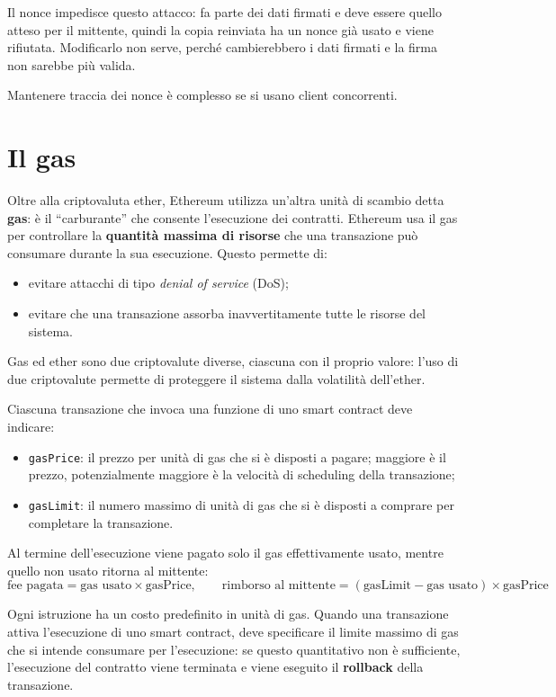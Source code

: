 \documentclass[a4paper, 11pt, oneside]{book}
\newcommand{\cod}[1]{\texttt{#1}} %
\begin{document}
	Il nonce impedisce questo attacco: fa parte dei dati firmati e deve essere quello
	atteso per il mittente, quindi la copia reinviata ha un nonce già usato e viene
	rifiutata. Modificarlo non serve, perché cambierebbero i dati firmati e la firma non
	sarebbe più valida.

	\begin{attenzione}
		Mantenere traccia dei nonce è complesso se si usano client concorrenti.
	\end{attenzione}

	\section{Il gas}
	Oltre alla criptovaluta ether, Ethereum utilizza un'altra unità di scambio detta
	\textbf{gas}: è il ``carburante'' che consente l'esecuzione dei contratti. Ethereum
	usa il gas per controllare la \textbf{quantità massima di risorse} che una
	transazione può consumare durante la sua esecuzione. Questo permette di:
	\begin{itemize}
		\item evitare attacchi di tipo \textit{denial of service} (DoS);
		\item evitare che una transazione assorba inavvertitamente tutte le risorse del
			sistema.
	\end{itemize}
	Gas ed ether sono due criptovalute diverse, ciascuna con il proprio valore: l'uso di
	due criptovalute permette di proteggere il sistema dalla volatilità dell'ether.

	Ciascuna transazione che invoca una funzione di uno smart contract deve indicare:
	\begin{itemize}
		\item \cod{gasPrice}: il prezzo per unità di gas che si è disposti a pagare;
			maggiore è il prezzo, potenzialmente maggiore è la velocità di scheduling
			della transazione;
		\item \cod{gasLimit}: il numero massimo di unità di gas che si è disposti a
			comprare per completare la transazione.
	\end{itemize}
	Al termine dell'esecuzione viene pagato solo il gas effettivamente usato, mentre
	quello non usato ritorna al mittente:
	\[
		\text{fee pagata} = \text{gas usato} \times \text{gasPrice}, \qquad
		\text{rimborso al mittente} = (\text{gasLimit} - \text{gas usato}) \times
		\text{gasPrice}
	\]

	Ogni istruzione ha un costo predefinito in unità di gas. Quando una transazione
	attiva l'esecuzione di uno smart contract, deve specificare il limite massimo di gas
	che si intende consumare per l'esecuzione: se questo quantitativo non è sufficiente,
	l'esecuzione del contratto viene terminata e viene eseguito il \textbf{rollback}
	della transazione.
\end{document}
